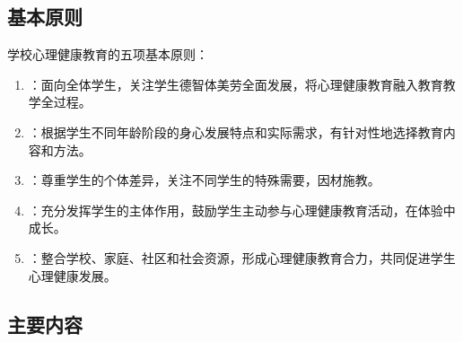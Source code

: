 \subsection{基本原则}

\begin{keybox}
学校心理健康教育的五项基本原则：

\begin{enumerate}[leftmargin=*]
    \item {}：面向全体学生，关注学生德智体美劳全面发展，将心理健康教育融入教育教学全过程。
    \item {}：根据学生不同年龄阶段的身心发展特点和实际需求，有针对性地选择教育内容和方法。
    \item {}：尊重学生的个体差异，关注不同学生的特殊需要，因材施教。
    \item {}：充分发挥学生的主体作用，鼓励学生主动参与心理健康教育活动，在体验中成长。
    \item {}：整合学校、家庭、社区和社会资源，形成心理健康教育合力，共同促进学生心理健康发展。
\end{enumerate}
\end{keybox}

\subsection{主要内容}

